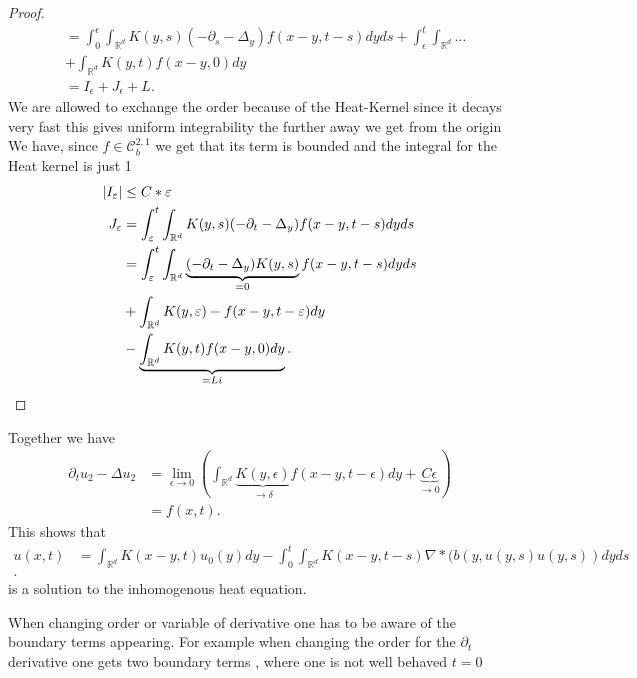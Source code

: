 \begin{proof}
\begin{align*}
                                 &=  \int_{0}^{\epsilon} \int_{\mathbb{R}^{d} } K(y,s) \left( -\partial_s - \Delta_y \right)f(x-y,t-s) dy ds +  \int_{\epsilon}^{t} \int_{\mathbb{R}^{d} } \ldots  \\
                                 &+   \int_{\mathbb{R}^{d} } K(y,t)f(x-y,0) dy\\
                                 &= I_{\epsilon} +  J_{\epsilon} + L
  .\end{align*}
  We are allowed to exchange the order because of the Heat-Kernel since it decays very fast this gives uniform integrability the further away we get from the origin\\
  We have, since $f \in  \mathcal{C}_b^{2,1}  $ we get that its term is bounded and the integral for the Heat kernel is just 1
  \begin{align*}
    \lvert I_\varepsilon\rvert &\le  C*\varepsilon\\
    J_{\varepsilon} &= \int_{\varepsilon}^{t}  \int_{\mathbb{R}^{d} } K(y,s)(-\partial_t - \Delta_y) f(x-y,t-s)dy ds\\
                 &= \int_{\varepsilon}^{t}  \int_{\mathbb{R}^{d} } \underbrace{(-\partial_t - \Delta_y)K(y,s)}_{=0}f(x-y,t-s)dy ds\\ 
                 &+ \int_{\mathbb{R}^{d} }K(y,\varepsilon) - f(x-y,t-\varepsilon) dy \\
                 &-\underbrace{\int_{\mathbb{R}^{d} } K(y,t) f(x-y,0) dy}_{=Li }
  .\end{align*}
\end{proof}
Together we have 
\begin{align*}
  \partial_t u_{2} - \Delta u_{2} &= \lim_{\epsilon \to 0} \left( \int_{\mathbb{R}^{d} } \underbrace{K(y,\epsilon)}_{\to \delta} f(x-y,t-\epsilon) dy + \underbrace{C\epsilon}_{\to 0} \right)  \\
                                  &= f(x,t)
.\end{align*}
This shows that 
\begin{align*}
  u(x,t) &=  \int_{\mathbb{R}^{d} } K(x-y,t) u_0(y) dy - \int_0^{t} \int_{\mathbb{R}^{d} }  K(x-y,t-s) \nabla * (b(y,u(y,s)u(y,s))dy ds \\
.\end{align*}
is a solution to the inhomogenous heat equation. 
\begin{remark}
  When changing order or variable of derivative one has to be aware of the boundary terms appearing.
 For example when changing the order for the $\partial_t$  derivative one gets two boundary terms , where one is not well behaved $t=0$
\end{remark}
